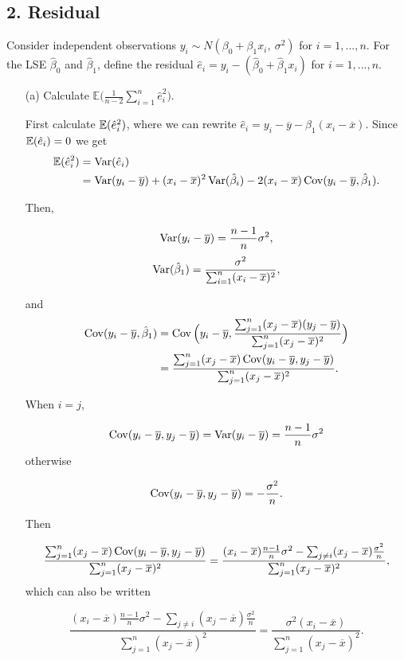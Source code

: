 \documentclass{tufte-book}
\begin{document}
\subsection{2. Residual} Consider independent observations $y_i \sim N(\beta_0+\beta_1x_i,\ \sigma^2)$ for $i=1,...,n$.  For the LSE $\hat{\beta}_0$ and $\hat{\beta}_1$, define the residual $\hat{e}_i = y_i - (\hat{\beta}_0+\hat{\beta}_1x_i)$ for $i=1,...,n$.
\begin{enumerate}
\item[(a)] Calculate $\mathbb{E}\big(\frac{1}{n-2} \sum_{i=1}^n \hat{e}_i^2\big)$.

First calculate $\operatorname{\mathbb{E}}(\hat{e}_i^2)$, where we can rewrite $\hat{e}_i=y_i-\overline{y}-\hat{\beta}_1(x_i-\overline{x})$.  Since $\operatorname{\mathbb{E}}(\hat{e}_i)=0$ we get
\begin{align*}
\operatorname{\mathbb{E}}(\hat{e}_i^2) &= \operatorname{Var}(\hat{e}_i) \\
&= \operatorname{Var}(y_i-\overline{y}) + (x_i-\overline{x})^2\operatorname{Var}(\hat{\beta}_i) - 2(x_i-\overline{x})\operatorname{Cov}(y_i-\overline{y}, \hat{\beta}_1).\\
\end{align*}

Then,

\[ \operatorname{Var}(y_i-\overline{y}) = \frac{n-1}{n}\sigma^2,\]
\[ \operatorname{Var}(\hat{\beta}_1) = \frac{\sigma^2}{\sum_{i=1}^n(x_i-\overline{x})^2}, \]

and
\begin{align*}
\operatorname{Cov}(y_i-\overline{y},\hat{\beta}_1) &= \operatorname{Cov}\Big(y_i-\overline{y}, \frac{\sum_{j=1}^n(x_j-\overline{x})(y_j-\overline{y})}{\sum_{j=1}^n(x_j-\overline{x})^2}  \Big)\\
&= \frac{\sum_{j=1}^n(x_j-\overline{x})\operatorname{Cov}(y_i-\overline{y}, y_j-\overline{y})}{\sum_{j=1}^n(x_j-\overline{x})^2}.\\
\end{align*}

When $i=j$,

\[ \operatorname{Cov}(y_i-\overline{y},y_j-\overline{y})=\operatorname{Var}(y_i-\overline{y}) = \frac{n-1}{n}\sigma^2 \]
otherwise

\[ \operatorname{Cov}(y_i-\overline{y},y_j-\overline{y})= -\frac{\sigma^2}{n}.\]

Then

\[ \frac{\sum_{j=1}^n(x_j-\overline{x})\operatorname{Cov}(y_i-\overline{y}, y_j-\overline{y})}{\sum_{j=1}^n(x_j-\overline{x})^2} = \frac{(x_i-\overline{x})\frac{n-1}{n}\sigma^2-\sum_{j\neq i}(x_j-\overline{x})\frac{\sigma^2}{n}}{\sum_{j=1}^n(x_j-\overline{x})^2}, \]
which can also be written

\[ \frac{(x_i-\overline{x})\frac{n-1}{n}\sigma^2-\sum_{j\neq i}(x_j-\overline{x})\frac{\sigma^2}{n}}{\sum_{j=1}^n(x_j-\overline{x})^2} = \frac{\sigma^2(x_i-\overline{x})}{\sum_{j=1}^n(x_j-\overline{x})^2}. \]


\end{enumerate}
\end{document}

